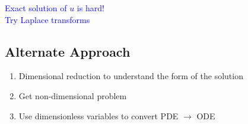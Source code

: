 \documentclass[
	date={September 4{,} 2024}
]{math486notes}
\begin{document}
\begin{center}
	\textcolor{blue}{Exact solution of $u$ is hard!\\Try Laplace transforms}
\end{center}

\subsection{Alternate Approach}\label{subsec:alternate-approach}
\begin{enumerate}
	\item Dimensional reduction to understand the form of the solution
	\item Get non-dimensional problem
	\item Use dimensionless variables to convert PDE $\rightarrow$ ODE
\end{enumerate}
\end{document}
